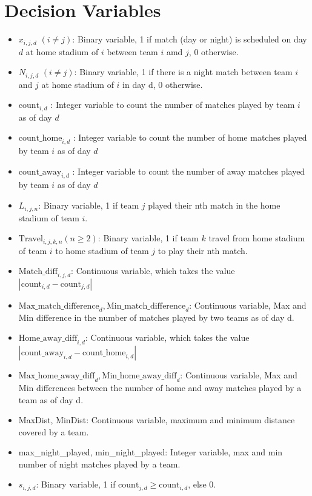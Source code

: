 \documentclass[a4paper, 12pt]{article}
\begin{document}
\section*{Decision Variables}
\begin{itemize}
    \item $x_{i,j,d}$ $(i \neq j)$: Binary variable, 1 if match (day or night) is scheduled on day $d$ at home stadium of $i$ between team $i$ amd $j$, 0 otherwise.
    \item $N_{i,j,d}$ $(i \neq j)$: Binary variable, 1 if there is a night match between team $i$ and $j$ at home stadium of $i$ in day d, 0 otherwise.
    \item $\text{count}_{i,d}$ : Integer variable to count the number of matches played by team $i$ as of day $d$
    \item $\text{count\_home}_{i,d}$ : Integer variable to count the number of home matches played by team $i$ as of day $d$
    \item $\text{count\_away}_{i,d}$ : Integer variable to count the number of away matches played by team $i$ as of day $d$
    \item $L_{i,j,n}$: Binary variable, 1 if team $j$ played their nth match in the home stadium of team $i$.
    \item $\text{Travel}_{i,j,k,n} (n \geq 2)$: Binary variable, 1 if team $k$ travel from home stadium of team $i$ to home stadium of team $j$ to play their nth match.
    \item $\text{Match\_diff}_{i,j,d}$: Continuous variable, which takes the value $|\text{count}_{i,d} - \text{count}_{j,d}|$ 
    \item $\text{Max\_match\_difference}_{d},\text{Min\_match\_difference}_{d}$: Continuous variable, Max and Min difference in the number of matches played by two teams as of day d.
    \item $\text{Home\_away\_diff}_{i,d}$: Continuous variable, which takes the value $|\text{count\_away}_{i,d} - \text{count\_home}_{i,d}|$ 
    \item $\text{Max\_home\_away\_diff}_{d},\text{Min\_home\_away\_diff}_{d}$: Continuous variable, Max and Min differences between the number of home and away matches played by a team as of day d. 
    \item MaxDist, MinDist: Continuous variable, maximum and minimum distance covered by a team.
    \item max\_night\_played, min\_night\_played: Integer variable, max and min number of night matches played by a team.
    \item $s_{i,j,d}$: Binary variable, 1 if $\text{count}_{j,d} \geq \text{count}_{i,d}$, else 0.

\end{itemize}
\end{document}
